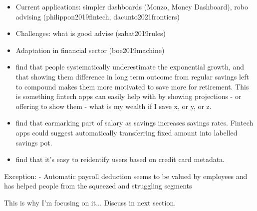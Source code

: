 \begin{itemize}
    \item Current applications: simpler dashboards (Monzo, Money Dashboard),
        robo advising (philippon2019fintech, dacunto2021frontiers)

    \item Challenges: what is good advise (sabat2019rules)

    \item Adaptation in financial sector (boe2019machine)

    \item \citet{mckenzie2011misunderstanding} find that people systematically
        underestimate the exponential growth, and that showing them difference
        in long term outcome from regular savings left to compound makes them
        more motivated to save more for retirement. This is something fintech
        apps can easily help with by showing projections - or offering to show
        them - what is my wealth if I save x, or y, or z.

    \item \citet{soman2011earmarking} find that earmarking part of salary as
        savings increases savings rates. Fintech apps could suggest
        automatically transferring fixed amount into labelled savings pot.
\end{itemize}

\begin{itemize}
    \item \citet{demontjoye2015unique} find that it's easy to reidentify users
        based on credit card metadata.
\end{itemize}


Exception:
\citet{philipps2021supporting}
- Automatic payroll deduction seems to be valued by employees and has helped
people from the squeezed and struggling segments 

This is why I'm focusing on it... Discuss in next section.
